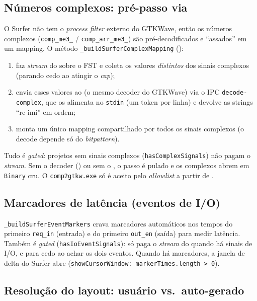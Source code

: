 \subsection{Números complexos: pré-passo via }
\label{sec:cap10-surfer-prepass}

O Surfer não tem o \emph{process filter} externo do GTKWave, então os números
complexos (\lstinline|comp_me3_| / \lstinline|comp_arr_me3_|) são pré-decodificados
e \enquote{assados} em um mapping. O método
\lstinline|_buildSurferComplexMapping| ():

\begin{enumerate}[label=\arabic*.]
  \item faz \emph{stream} do  sobre o FST e coleta os valores
        \emph{distintos} dos sinais complexos (parando cedo ao atingir o \emph{cap});
  \item envia esses valores ao  (o mesmo decoder do GTKWave) via o
        IPC \lstinline|decode-complex|, que os alimenta no \lstinline|stdin| (um
        token por linha) e devolve as strings \enquote{re imi} em ordem;
  \item monta um único mapping compartilhado por todos os sinais complexos (o
        decode depende só do \emph{bitpattern}).
\end{enumerate}

Tudo é \emph{gated}: projetos sem sinais complexos (\lstinline|hasComplexSignals|)
não pagam o \emph{stream}. Sem o decoder
() ou sem o , o passo é pulado e os
complexos abrem em \lstinline|Binary| cru. O \lstinline|comp2gtkw.exe| só é aceito
pelo \emph{allowlist} a partir de .

\subsection{Marcadores de latência (eventos de I/O)}
\label{sec:cap10-surfer-markers}

\lstinline|_buildSurferEventMarkers| crava marcadores automáticos nos tempos do
primeiro \lstinline|req_in| (entrada) e do primeiro \lstinline|out_en| (saída) para
medir latência. Também é \emph{gated} (\lstinline|hasIoEventSignals|): só paga o
\emph{stream} do  quando há sinais de I/O, e para cedo ao achar os dois
eventos. Quando há marcadores, a janela de delta do Surfer abre
(\lstinline|showCursorWindow: markerTimes.length > 0|).

\subsection{Resolução do layout: usuário vs.\ auto-gerado}
\label{sec:cap10-surfer-resolve}

